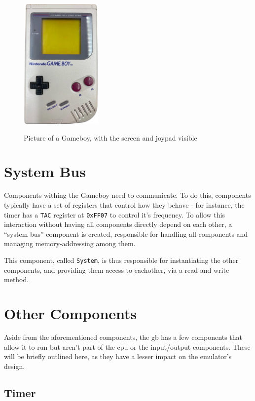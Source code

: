 \documentclass[11pt]{report}
\begin{document}
\begin{figure}[h]
    \centering
    \includegraphics[width=4cm]{images/gameboy}\\
    \caption{Picture of a Gameboy, with the screen and joypad visible}
    \label{fig:gb-front}
\end{figure}

\section{System Bus}

Components withing the Gameboy need to communicate. To do this, components typically have a set of registers that control how they behave - for instance, the timer has a \texttt{TAC} register at \texttt{0xFF07} to control it's frequency. To allow this interaction without having all components directly depend on each other, a ``system bus'' component is created, responsible for handling all components and managing memory-addressing among them.

This component, called \texttt{System}, is thus responsible for instantiating the other components, and providing them access to eachother, via a read and write method.

\section{Other Components}

Aside from the aforementioned components, the \gls{gb} has a few components that allow it to run but aren't part of the \gls{cpu} or the input/output components. These will be briefly outlined here, as they have a lesser impact on the emulator's design.

\subsection{Timer}
\end{document}
